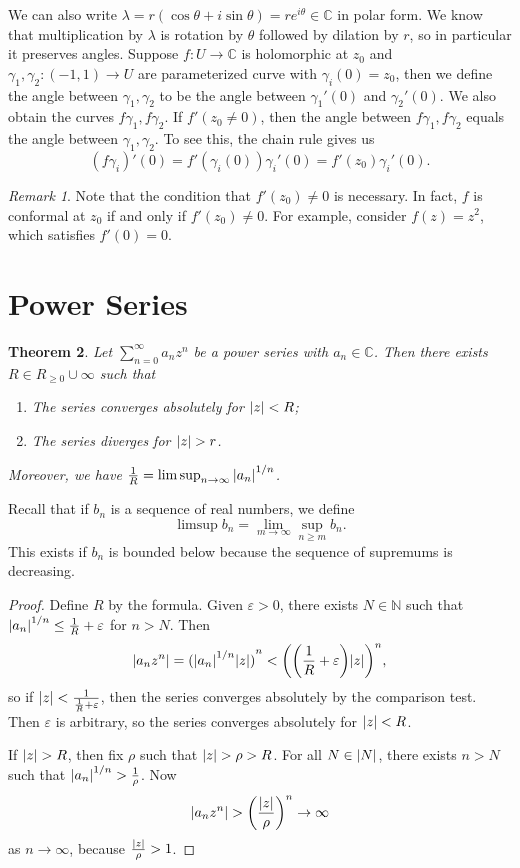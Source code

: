 \documentclass[leqno, openany]{memoir}
\newtheorem{thm}{Theorem}[section]
\theoremstyle{definition}
\theoremstyle{remark}
\newtheorem{rmk}[thm]{Remark}
\theoremstyle{plain}
\theoremstyle{definition}
\theoremstyle{remark}
\newcommand{\C}{\mathbb{C}}
\newcommand{\N}{\mathbb{N}}
\newcommand{\ep}{\varepsilon}
\begin{document}
We can also write $\lambda = r(\cos \theta + i \sin\theta) = re^{i\theta} \in
\C$ in polar form. We know that multiplication by $\lambda$ is rotation by
$\theta$ followed by dilation by $r$, so in particular it preserves angles.
Suppose $f \colon U \to \C$ is holomorphic at $z_0$ and $\gamma_1, \gamma_2
\colon (-1,1) \to U$ are parameterized curve with $\gamma_i(0) = z_0$, then we
define the angle between $\gamma_1, \gamma_2$ to be the angle between
$\gamma_1'(0)$ and $\gamma_2'(0)$. We also obtain the curves $f \gamma_1, f
\gamma_2$. If $f'(z_0 \neq 0)$, then the angle between $f \gamma_1, f\gamma_2$
equals the angle between $\gamma_1, \gamma_2$. To see this, the chain rule
gives us \[ {(f \gamma_i)}'(0) = f'(\gamma_i(0)) \gamma_i'(0) = f'(z_0)
\gamma_i'(0). \] \begin{rmk} Note that the condition that $f'(z_0) \neq 0$ is
necessary. In fact, $f$ is conformal at $z_0$ if and only if $f'(z_0) \neq 0$.
For example, consider $f(z) = z^2$, which satisfies $f'(0) = 0$.  \end{rmk}

\section{Power Series}%

\begin{thm} Let $\sum_{n=0}^{\infty} a_n z^n$ be a power series with $a_n \in
    \C$. Then there exists $R \in R_{\geq 0} \cup \infty$ such that
    \begin{enumerate} \item The series converges absolutely for $\abs{z} < R$;
        \item The series diverges for $\abs{z} > r$.  \end{enumerate} Moreover,
        we have $\frac{1}{R} = \limsup_{n \to \infty} \abs{a_n}^{1/n}$.
    \end{thm}

Recall that if $b_n$ is a sequence of real numbers, we define \[ \limsup b_n =
\lim_{m \to \infty} \sup_{n \geq m} b_n. \] This exists if $b_n$ is bounded
below because the sequence of supremums is decreasing.

\begin{proof} Define $R$ by the formula. Given $\ep > 0$, there exists $N \in
    \N$ such that $\abs{a_n}^{1/n} \leq \frac{1}{R} + \ep$ for $n > N$. Then \[
    \abs{a_n z^n} = {(\abs{a_n}^{1/n} \abs{z})}^{n} < {\qty( \qty(\frac{1}{R} +
\ep) \abs{z} )}^n, \] so if $\abs{z} < \frac{1}{\frac{1}{R} + \ep}$, then the
series converges absolutely by the comparison test. Then $\ep$ is arbitrary, so
the series converges absolutely for $\abs{z} < R$.

    If $\abs{z} > R$, then fix $\rho$ such that $\abs{z} > \rho > R$. For all
    $N \in \abs{N}$, there exists $n > N$ such that $\abs{a_n}^{1/n} >
    \frac{1}{\rho}$. Now \[ \abs{a_n z^n} > \qty(\frac{\abs{z}}{\rho})^n \to
    \infty \] as $n \to \infty$, because $\frac{\abs{z}}{\rho} > 1$.
\end{proof}
\end{document}
